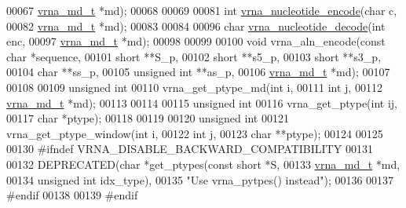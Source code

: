 \begin{DoxyCode}
00067                               \hyperlink{group__model__details_structvrna__md__s}{vrna\_md\_t}   *md);
00068 
00069 
00081 \textcolor{keywordtype}{int} \hyperlink{group__utils_gac12bf00123f88621c9be847b0879c1fb}{vrna\_nucleotide\_encode}(\textcolor{keywordtype}{char}       c,
00082                            \hyperlink{group__model__details_structvrna__md__s}{vrna\_md\_t}  *md);
00083 
00084 
00096 \textcolor{keywordtype}{char} \hyperlink{group__utils_ga48ef585e697be9c8a08ed68c655e29b6}{vrna\_nucleotide\_decode}(\textcolor{keywordtype}{int}       enc,
00097                             \hyperlink{group__model__details_structvrna__md__s}{vrna\_md\_t} *md);
00098 
00099 
00100 \textcolor{keywordtype}{void} vrna\_aln\_encode(\textcolor{keyword}{const} \textcolor{keywordtype}{char}   *sequence,
00101                      \textcolor{keywordtype}{short}        **S\_p,
00102                      \textcolor{keywordtype}{short}        **s5\_p,
00103                      \textcolor{keywordtype}{short}        **s3\_p,
00104                      \textcolor{keywordtype}{char}         **ss\_p,
00105                      \textcolor{keywordtype}{unsigned} \textcolor{keywordtype}{int} **as\_p,
00106                      \hyperlink{group__model__details_structvrna__md__s}{vrna\_md\_t}    *md);
00107 
00108 
00109 \textcolor{keywordtype}{unsigned} \textcolor{keywordtype}{int}
00110 vrna\_get\_ptype\_md(\textcolor{keywordtype}{int}       i,
00111                   \textcolor{keywordtype}{int}       j,
00112                   \hyperlink{group__model__details_structvrna__md__s}{vrna\_md\_t} *md);
00113 
00114 
00115 \textcolor{keywordtype}{unsigned} \textcolor{keywordtype}{int}
00116 vrna\_get\_ptype(\textcolor{keywordtype}{int}  ij,
00117                \textcolor{keywordtype}{char} *ptype);
00118 
00119 
00120 \textcolor{keywordtype}{unsigned} \textcolor{keywordtype}{int}
00121 vrna\_get\_ptype\_window(\textcolor{keywordtype}{int}   i,
00122                       \textcolor{keywordtype}{int}   j,
00123                       \textcolor{keywordtype}{char}  **ptype);
00124 
00125 
00130 \textcolor{preprocessor}{#ifndef VRNA\_DISABLE\_BACKWARD\_COMPATIBILITY}
00131 
00132 DEPRECATED(\textcolor{keywordtype}{char} *get\_ptypes(\textcolor{keyword}{const} \textcolor{keywordtype}{short}   *S,
00133                             \hyperlink{group__model__details_structvrna__md__s}{vrna\_md\_t}     *md,
00134                             \textcolor{keywordtype}{unsigned} \textcolor{keywordtype}{int}  idx\_type),
00135           \textcolor{stringliteral}{"Use vrna\_pytpes() instead"});
00136 
00137 \textcolor{preprocessor}{#endif}
00138 
00139 \textcolor{preprocessor}{#endif}
\end{DoxyCode}
